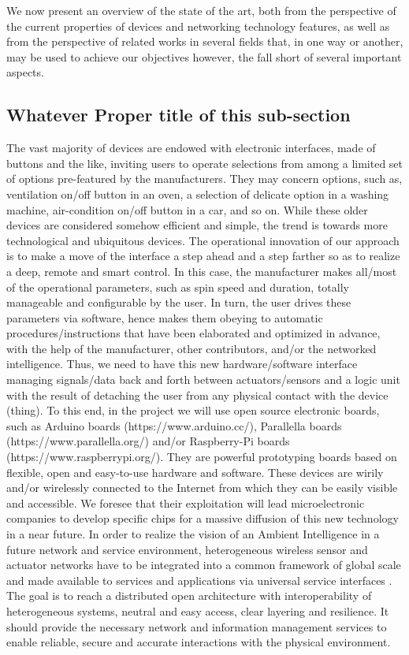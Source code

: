 We now present an overview of the state of the art, both from the perspective of the current properties of devices and networking technology features, as well as from the perspective of related works in several fields that, in one way or another, may be used to achieve our objectives however, the fall short of several important aspects.\\

\subsection{Whatever Proper title of this sub-section}
The vast majority of devices are endowed with electronic interfaces, made of buttons and the like, inviting users to operate selections from among a limited set of options pre-featured by the manufacturers. They may concern options, such as, ventilation on/off button in an oven, a selection of delicate option in a washing machine, air-condition on/off button in a car, and so on. While these older devices are considered somehow efficient and simple, the trend is towards more technological and ubiquitous devices.
The operational innovation of our approach is to make a move of the interface a step ahead and a step farther so as to realize a deep, remote and smart control. In this case, the manufacturer makes all/most of the operational parameters, such as spin speed and duration, totally manageable and configurable by the user. In turn, the user drives these parameters via software, hence makes them obeying to automatic procedures/instructions that have been elaborated and optimized in advance, with the help of the manufacturer, other contributors, and/or the networked intelligence.
Thus, we need to have this new hardware/software interface managing signals/data back and forth between actuators/sensors and a logic unit with the result of detaching the user from any physical contact with the device (thing). To this end, in the project we will use open source electronic boards, such as Arduino boards (https://www.arduino.cc/), Parallella boards (https://www.parallella.org/) and/or Raspberry-Pi boards (https://www.raspberrypi.org/). They are powerful prototyping boards based on flexible, open and easy-to-use hardware and software. These devices are wirily and/or wirelessly connected to the Internet from which they can be easily visible and accessible. We foresee that their exploitation will lead microelectronic companies to develop specific chips for a massive diffusion of this new technology in a near future.
In order to realize the vision of an Ambient Intelligence in a future network and service environment, heterogeneous wireless sensor and actuator networks have to be integrated into a common framework of global scale and made available to services and applications via universal service interfaces \cite{SSR05}. The goal is to reach a distributed open architecture with interoperability of heterogeneous systems, neutral and easy access, clear layering and resilience. It should provide the necessary network and information management services to enable reliable, secure and accurate interactions with the physical environment.
